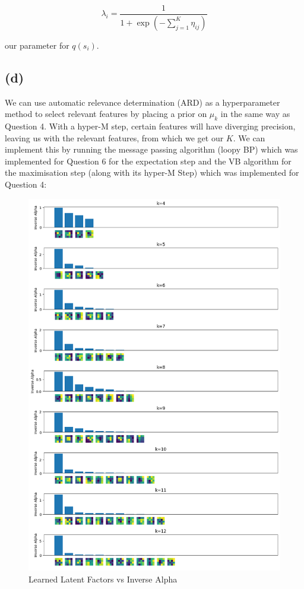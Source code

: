 \documentclass[12pt]{article}
\begin{document}
\[\lambda_i = \frac{1}{1+\exp(-\sum_{j=1}^{K} \eta_{ij})}\]

our parameter for $q(s_i)$.


\newpage
\subsection*{(d)}

We can use automatic relevance determination (ARD) as a hyperparameter method to select relevant features by placing a prior on $\mu_k$ in the same way as Question 4. With a hyper-M step, certain features will have diverging precision, leaving us with the relevant features, from which we get our $K$. We can implement this by running the message passing algorithm (loopy BP) which was implemented for Question 6 for the expectation step and the VB algorithm for the maximisation step (along with its hyper-M Step) which was implemented for Question 4:

\begin{figure}[h]
\centering
\includegraphics[scale=0.47]{outputs/q5/d-1-latent-factors-comparison}
\caption{Learned Latent Factors vs Inverse Alpha}
\label{fig:}
\end{figure}
\end{document}
